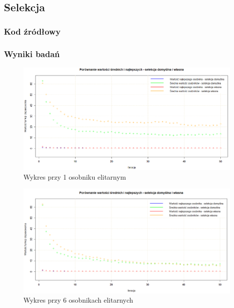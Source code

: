 \subsection{Selekcja}

\subsubsection{Kod źródłowy}


\subsubsection{Wyniki badań}


\begin{figure}[]
	\centering
	\hspace*{-0.8in}
	\includegraphics[scale = 0.5]{img/zad1/sel_1}
	\caption{Wykres przy 1 osobniku elitarnym}  
	\label{rys:sel_1} 
\end{figure}

\begin{figure}[H]
	\centering
	\hspace*{-0.8in}
	\includegraphics[scale = 0.5]{img/zad1/sel_6}
	\caption{Wykres przy 6 osobnikach elitarnych}  
	\label{rys:sel_6} 
\end{figure}

